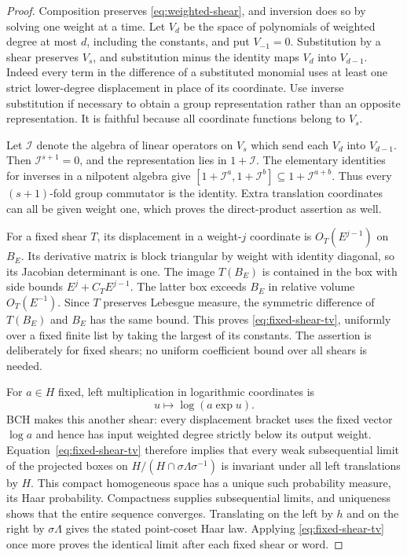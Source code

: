 \begin{proof}
Composition preserves \eqref{eq:weighted-shear}, and inversion does so
by solving one weight at a time.  Let $V_d$ be the space of polynomials
of weighted degree at most $d$, including the constants, and put
$V_{-1}=0$.  Substitution by a shear preserves $V_s$, and substitution
minus the identity maps $V_d$ into $V_{d-1}$.  Indeed every term in the
difference of a substituted monomial uses at least one strict
lower-degree displacement in place of its coordinate.  Use inverse
substitution if necessary to obtain a group representation rather than
an opposite representation.  It is faithful because all coordinate
functions belong to $V_s$.

Let $\mathcal I$ denote the algebra of linear operators on $V_s$ which
send each $V_d$ into $V_{d-1}$.  Then $\mathcal I^{s+1}=0$, and the
representation lies in $1+\mathcal I$.  The elementary identities for
inverses in a nilpotent algebra give
$[1+\mathcal I^a,1+\mathcal I^b]\subseteq1+\mathcal I^{a+b}$.
Thus every $(s+1)$-fold group commutator is the identity.  Extra
translation coordinates can all be given weight one, which proves the
direct-product assertion as well.

For a fixed shear $T$, its displacement in a weight-$j$ coordinate is
$O_T(E^{j-1})$ on $B_E$.  Its derivative matrix is block triangular by
weight with identity diagonal, so its Jacobian determinant is one.
The image $T(B_E)$ is contained in the box with side bounds
$E^j+C_T E^{j-1}$.  The latter box exceeds $B_E$ in relative volume
$O_T(E^{-1})$.  Since $T$ preserves Lebesgue measure, the symmetric
difference of $T(B_E)$ and $B_E$ has the same bound.  This proves
\eqref{eq:fixed-shear-tv}, uniformly over a fixed finite list by taking
the largest of its constants.  The assertion is deliberately for fixed
shears; no uniform coefficient bound over all shears is needed.

For $a\in H$ fixed, left multiplication in logarithmic coordinates is
\[
 u\longmapsto\log(a\exp u).
\]
BCH makes this another shear: every displacement bracket uses the fixed
vector $\log a$ and hence has input weighted degree strictly below its
output weight.  Equation~\eqref{eq:fixed-shear-tv} therefore implies
that every weak subsequential limit of the projected boxes on
$H/(H\cap\sigma\Lambda\sigma^{-1})$ is invariant under all left
translations by $H$.  This compact homogeneous space has a unique
such probability measure, its Haar probability.  Compactness supplies
subsequential limits, and uniqueness shows that the entire sequence
converges.  Translating on the left by $h$ and on the right by
$\sigma\Lambda$ gives the stated point-coset Haar law.  Applying
\eqref{eq:fixed-shear-tv} once more proves the identical limit after
each fixed shear or word.
\end{proof}

